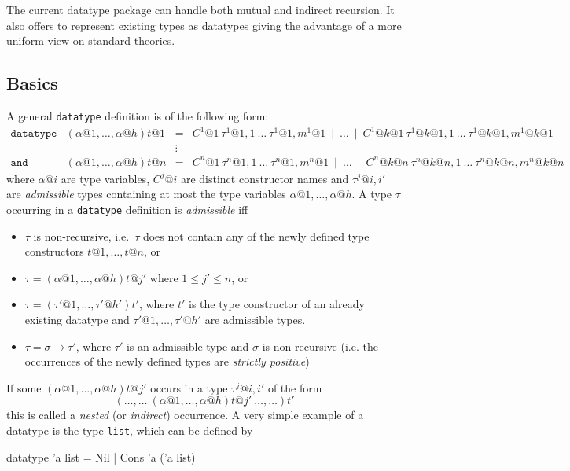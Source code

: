 The current datatype package can handle both mutual and indirect recursion.
It also offers to represent existing types as datatypes giving the advantage
of a more uniform view on standard theories.


\subsection{Basics}
\label{subsec:datatype:basics}

A general \texttt{datatype} definition is of the following form:
\[
\begin{array}{llcl}
\mathtt{datatype} & (\alpha@1,\ldots,\alpha@h)t@1 & = &
  C^1@1~\tau^1@{1,1}~\ldots~\tau^1@{1,m^1@1} ~\mid~ \ldots ~\mid~
    C^1@{k@1}~\tau^1@{k@1,1}~\ldots~\tau^1@{k@1,m^1@{k@1}} \\
 & & \vdots \\
\mathtt{and} & (\alpha@1,\ldots,\alpha@h)t@n & = &
  C^n@1~\tau^n@{1,1}~\ldots~\tau^n@{1,m^n@1} ~\mid~ \ldots ~\mid~
    C^n@{k@n}~\tau^n@{k@n,1}~\ldots~\tau^n@{k@n,m^n@{k@n}}
\end{array}
\]
where $\alpha@i$ are type variables, $C^j@i$ are distinct constructor
names and $\tau^j@{i,i'}$ are {\em admissible} types containing at
most the type variables $\alpha@1, \ldots, \alpha@h$. A type $\tau$
occurring in a \texttt{datatype} definition is {\em admissible} iff
\begin{itemize}
\item $\tau$ is non-recursive, i.e.\ $\tau$ does not contain any of the
newly defined type constructors $t@1,\ldots,t@n$, or
\item $\tau = (\alpha@1,\ldots,\alpha@h)t@{j'}$ where $1 \leq j' \leq n$, or
\item $\tau = (\tau'@1,\ldots,\tau'@{h'})t'$, where $t'$ is
the type constructor of an already existing datatype and $\tau'@1,\ldots,\tau'@{h'}$
are admissible types.
\item $\tau = \sigma \to \tau'$, where $\tau'$ is an admissible
type and $\sigma$ is non-recursive (i.e. the occurrences of the newly defined
types are {\em strictly positive})
\end{itemize}
If some $(\alpha@1,\ldots,\alpha@h)t@{j'}$ occurs in a type $\tau^j@{i,i'}$
of the form
\[
(\ldots,\ldots ~ (\alpha@1,\ldots,\alpha@h)t@{j'} ~ \ldots,\ldots)t'
\]
this is called a {\em nested} (or \emph{indirect}) occurrence. A very simple
example of a datatype is the type \texttt{list}, which can be defined by
\begin{ttbox}
datatype 'a list = Nil
                 | Cons 'a ('a list)
\end{ttbox}

